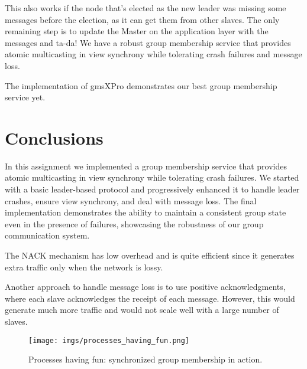 \documentclass[a4paper, 11pt]{article}
\begin{document}
This also works if the node that's elected as the new leader was missing some messages before the election, as it can get them from other slaves. The only remaining step is to update the Master on the application layer with the messages and ta-da! We have a robust group membership service that provides atomic multicasting in view synchrony while tolerating crash failures and message loss.

The implementation of gmsXPro demonstrates our best group membership service yet.

\section{Conclusions}

In this assignment we implemented a group membership service that provides atomic multicasting in view synchrony while tolerating crash failures. We started with a basic leader-based protocol and progressively enhanced it to handle leader crashes, ensure view synchrony, and deal with message loss. The final implementation demonstrates the ability to maintain a consistent group state even in the presence of failures, showcasing the robustness of our group communication system.

The NACK mechanism has low overhead and is quite efficient since it generates extra traffic only when the network is lossy.

Another approach to handle message loss is to use positive acknowledgments, where each slave acknowledges the receipt of each message. However, this would generate much more traffic and would not scale well with a large number of slaves.

\begin{figure}[H]
  \centering
  \texttt{[image: imgs/processes\_having\_fun.png]}
  \caption{Processes having fun: synchronized group membership in action.}
  \label{fig:processes_having_fun}
\end{figure}
\end{document}
